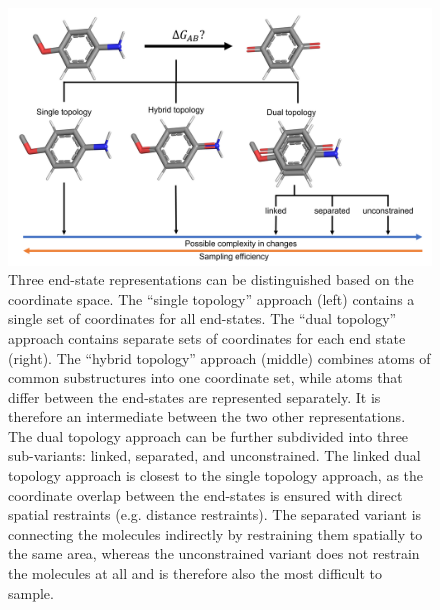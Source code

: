 \begin{figure}[h!]
    \centering
    \includegraphics[width=\linewidth]{fig/theory/landscape_of_simulationApproaches.png}
    \caption{Three end-state representations can be distinguished based on the coordinate space. The ``single topology'' approach (left) contains a single set of coordinates for all end-states. The ``dual topology'' approach contains separate sets of coordinates for each end state (right). The ``hybrid topology'' approach (middle) combines atoms of common substructures into one coordinate set, while atoms that differ between the end-states are represented separately. It is therefore an intermediate between the two other representations. The dual topology approach can be further subdivided into three sub-variants: linked, separated, and unconstrained. The linked dual topology approach is closest to the single topology approach, as the coordinate overlap between the end-states is ensured with direct spatial restraints (e.g. distance restraints). The separated variant is connecting the molecules indirectly by restraining them spatially to the same area, whereas the unconstrained variant does not restrain the molecules at all and is therefore also the most difficult to sample.}
    \label{fig:Topology Types}
\end{figure}

